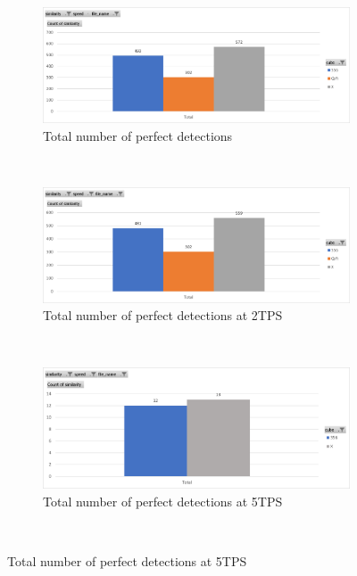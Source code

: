 \begin{figure}
\caption{Perfect Detections by Cube}
\label{fig:perfect-detections-by-cube}
\begin{subfigure}{\textwidth}
    \centering
    \caption{Total number of perfect detections}
    \label{fig:perfect-detections-by-cube-total}
    \includegraphics[width=\linewidth]{Figures/7 Evaluation/perfect_detections_by_cube.png}
    \vspace*{.1mm}
\end{subfigure}\\
\begin{subfigure}{\textwidth}
    \centering
    \caption{Total number of perfect detections at 2TPS}
    \label{fig:perfect-detections-by-cube-2tps}
    \includegraphics[width=\linewidth]{Figures/7 Evaluation/perfect_detections_by_cube_2tps.png}
    \vspace*{.1mm}
\end{subfigure}\\
\begin{subfigure}{\textwidth}
    \centering
    \caption{Total number of perfect detections at 5TPS}
    \label{fig:perfect-detections-by-cube-5tps}
    \includegraphics[width=\linewidth]{Figures/7 Evaluation/perfect_detections_by_cube_5tps.png}
    \vspace*{.1mm}
\end{subfigure}\\
\end{figure}

